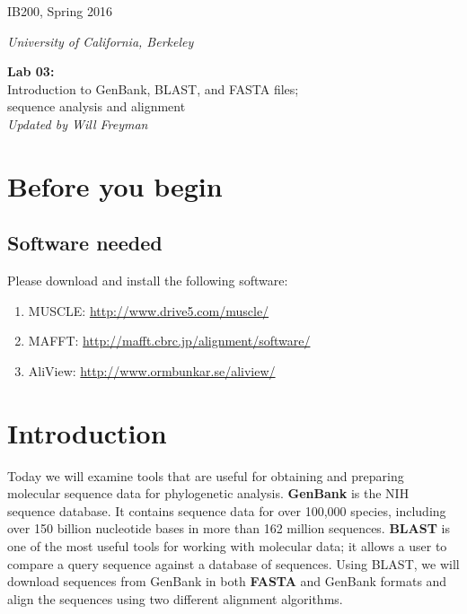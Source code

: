 \documentclass[11pt]{article}
\begin{document}
\noindent
\large
\begin{minipage}{0.5\textwidth}
\begin{flushleft} 
IB200, Spring 2016
\end{flushleft}
\end{minipage}
\begin{minipage}{0.5\textwidth}
\begin{flushright} 
\textit{University of California, Berkeley}
\end{flushright}
\end{minipage}

\vspace{0.5cm}


\begin{center}
\Large \textbf{Lab 03:} \\
Introduction to GenBank, BLAST, and FASTA files; \\
sequence analysis and alignment \\
\normalsize
\textit{Updated by Will Freyman}
\end{center}

\vspace{0.5cm}

\section{Before you begin}

\subsection{Software needed}

Please download and install the following software:
\begin{enumerate}
  \item MUSCLE: \url{http://www.drive5.com/muscle/}
  \item MAFFT: \url{http://mafft.cbrc.jp/alignment/software/}
  \item AliView: \url{http://www.ormbunkar.se/aliview/}
\end{enumerate}


\section{Introduction}

Today we will examine tools that are useful for obtaining and preparing
molecular sequence data for phylogenetic analysis. \textbf{GenBank} is the NIH sequence
database. It contains sequence data
for over 100,000 species, 
including over 150 billion nucleotide bases in more than 162 million sequences.
\textbf{BLAST} is one of the most useful tools for working with molecular data; 
it allows a user to compare a query sequence against a database of sequences.
Using BLAST, we will download sequences from GenBank in both \textbf{FASTA} and GenBank formats
and align the sequences using two different alignment algorithms.
\end{document}
